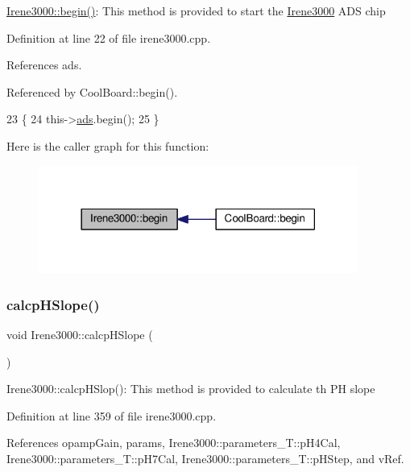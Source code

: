 \hyperlink{classIrene3000_ad5891806c500ae1007afe52b9e304c2b}{Irene3000\+::begin()}\+: This method is provided to start the \hyperlink{classIrene3000}{Irene3000} A\+DS chip 

Definition at line 22 of file irene3000.\+cpp.



References ads.



Referenced by Cool\+Board\+::begin().


\begin{DoxyCode}
23 \{
24     this->\hyperlink{classIrene3000_a1215e77ba761c9908d80d691f149e135}{ads}.begin();
25 \}
\end{DoxyCode}
Here is the caller graph for this function\+:\nopagebreak
\begin{figure}[H]
\begin{center}
\leavevmode
\includegraphics[width=297pt]{classIrene3000_ad5891806c500ae1007afe52b9e304c2b_icgraph}
\end{center}
\end{figure}
\mbox{\label{classIrene3000_a81f6a79e546679692053f7ac1af49613}} 
\subsubsection{\texorpdfstring{calcp\+H\+Slope()}{calcpHSlope()}}
{\footnotesize\ttfamily void Irene3000\+::calcp\+H\+Slope (\begin{DoxyParamCaption}{ }\end{DoxyParamCaption})}

Irene3000\+::calcp\+H\+Slop()\+: This method is provided to calculate th PH slope 

Definition at line 359 of file irene3000.\+cpp.



References opamp\+Gain, params, Irene3000\+::parameters\+\_\+\+T\+::p\+H4\+Cal, Irene3000\+::parameters\+\_\+\+T\+::p\+H7\+Cal, Irene3000\+::parameters\+\_\+\+T\+::p\+H\+Step, and v\+Ref.



